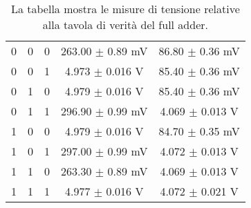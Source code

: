 \documentclass[a4paper,11pt]{article}
\begin{document}
	\begin{table}
		\centering
		\begin{tabular}{|c|c|c||c|c|}
			
			\hline
			\cellcolor{yellow} \text{A} & \cellcolor{yellow} \text{B}  & \cellcolor{yellow} \text{$C_i$} & \cellcolor{yellow} \text{$S$} & \cellcolor{yellow} \text{$C_o$} \\
			\hline
			0 & 0 & 0 & 263.00 $\pm$ 0.89 mV & 86.80 $\pm$ 0.36 mV \\
			0 & 0 & 1 & 4.973 $\pm$ 0.016 V & 85.40 $\pm$ 0.36 mV \\
			0 & 1 & 0 & 4.979 $\pm$ 0.016 V & 85.40 $\pm$ 0.36 mV \\
			0 & 1 & 1 & 296.90 $\pm$ 0.99 mV & 4.069 $\pm$ 0.013 V \\
			1 & 0 & 0 & 4.979 $\pm$ 0.016 V & 84.70 $\pm$ 0.35 mV \\
			1 & 0 & 1 & 297.00 $\pm$ 0.99 mV & 4.072 $\pm$ 0.013 V \\
			1 & 1 & 0 & 263.30 $\pm$ 0.89 mV & 4.069 $\pm$ 0.013 V\\
			1 & 1 & 1 & 4.977 $\pm$ 0.016 V & 4.072 $\pm$ 0.021 V \\
			\hline
		\end{tabular}
		\caption{La tabella mostra le misure di tensione relative alla tavola di verità del full adder.}
		\label{tab:fa_mis}	
	\end{table}
	
	
	
	
	
\end{document}
